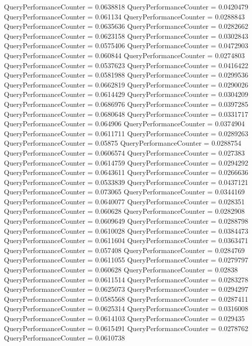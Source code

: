 \documentclass[9pt]{article}
\theoremstyle{plain}
\theoremstyle{definition}
\theoremstyle{remark}
\numberwithin{equation}{section}
\begin{document}
QueryPerformanceCounter  =  0.0638818
QueryPerformanceCounter  =  0.0420479
QueryPerformanceCounter  =  0.061134
QueryPerformanceCounter  =  0.0288843
QueryPerformanceCounter  =  0.0635636
QueryPerformanceCounter  =  0.0282662
QueryPerformanceCounter  =  0.0623158
QueryPerformanceCounter  =  0.0302843
QueryPerformanceCounter  =  0.0575406
QueryPerformanceCounter  =  0.0472903
QueryPerformanceCounter  =  0.060844
QueryPerformanceCounter  =  0.0274803
QueryPerformanceCounter  =  0.0537623
QueryPerformanceCounter  =  0.0416422
QueryPerformanceCounter  =  0.0581988
QueryPerformanceCounter  =  0.0299536
QueryPerformanceCounter  =  0.0662819
QueryPerformanceCounter  =  0.0290026
QueryPerformanceCounter  =  0.0614429
QueryPerformanceCounter  =  0.0304209
QueryPerformanceCounter  =  0.0686976
QueryPerformanceCounter  =  0.0397285
QueryPerformanceCounter  =  0.0680648
QueryPerformanceCounter  =  0.0331717
QueryPerformanceCounter  =  0.064906
QueryPerformanceCounter  =  0.0374904
QueryPerformanceCounter  =  0.0611711
QueryPerformanceCounter  =  0.0289263
QueryPerformanceCounter  =  0.05875
QueryPerformanceCounter  =  0.0288754
QueryPerformanceCounter  =  0.0606574
QueryPerformanceCounter  =  0.027383
QueryPerformanceCounter  =  0.0614759
QueryPerformanceCounter  =  0.0294292
QueryPerformanceCounter  =  0.0643611
QueryPerformanceCounter  =  0.0266636
QueryPerformanceCounter  =  0.0533839
QueryPerformanceCounter  =  0.0437121
QueryPerformanceCounter  =  0.073065
QueryPerformanceCounter  =  0.0344169
QueryPerformanceCounter  =  0.0640077
QueryPerformanceCounter  =  0.028351
QueryPerformanceCounter  =  0.060628
QueryPerformanceCounter  =  0.0282908
QueryPerformanceCounter  =  0.0609649
QueryPerformanceCounter  =  0.0288798
QueryPerformanceCounter  =  0.0610028
QueryPerformanceCounter  =  0.0384473
QueryPerformanceCounter  =  0.0611604
QueryPerformanceCounter  =  0.0363471
QueryPerformanceCounter  =  0.057408
QueryPerformanceCounter  =  0.0284769
QueryPerformanceCounter  =  0.0611055
QueryPerformanceCounter  =  0.0279797
QueryPerformanceCounter  =  0.060628
QueryPerformanceCounter  =  0.02838
QueryPerformanceCounter  =  0.0611514
QueryPerformanceCounter  =  0.0283278
QueryPerformanceCounter  =  0.0625073
QueryPerformanceCounter  =  0.0294297
QueryPerformanceCounter  =  0.0585568
QueryPerformanceCounter  =  0.0287411
QueryPerformanceCounter  =  0.0625314
QueryPerformanceCounter  =  0.0316008
QueryPerformanceCounter  =  0.0614103
QueryPerformanceCounter  =  0.029435
QueryPerformanceCounter  =  0.0615491
QueryPerformanceCounter  =  0.0278762
QueryPerformanceCounter  =  0.0610738
\end{document}
